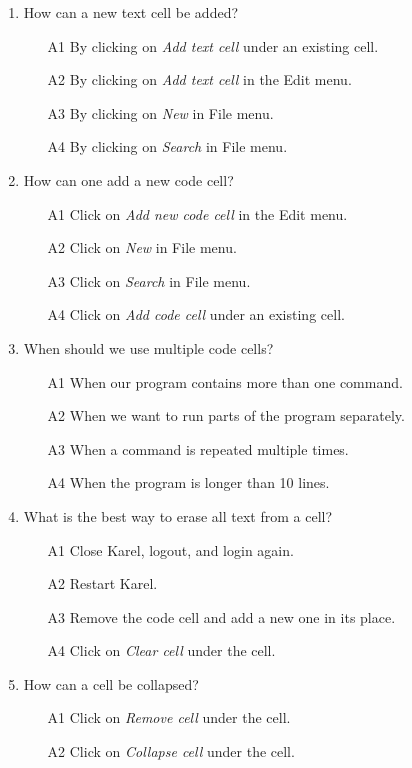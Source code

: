 \begin{enumerate}
\item How can a new text cell be added?
\begin{enumerate}
\item[A1] By clicking on {\em Add text cell} under an existing cell.
\item[A2] By clicking on {\em Add text cell} in the Edit menu.
\item[A3] By clicking on {\em New} in File menu.
\item[A4] By clicking on {\em Search} in File menu.
\end{enumerate}
\item How can one add a new code cell?
\begin{enumerate}
\item[A1] Click on {\em Add new code cell} in the Edit menu.
\item[A2] Click on {\em New} in File menu.
\item[A3] Click on {\em Search} in File menu.
\item[A4] Click on {\em Add code cell} under an existing cell.
\end{enumerate}
\item When should we use multiple code cells?
\begin{enumerate}
\item[A1] When our program contains more than one command.
\item[A2] When we want to run parts of the program separately.
\item[A3] When a command is repeated multiple times.
\item[A4] When the program is longer than 10 lines.
\end{enumerate}
\item What is the best way to erase all text from a cell?
\begin{enumerate}
\item[A1] Close Karel, logout, and login again. 
\item[A2] Restart Karel.
\item[A3] Remove the code cell and add a new one in its place.
\item[A4] Click on {\em Clear cell} under the cell.
\end{enumerate}
\item How can a cell be collapsed?
\begin{enumerate}
\item[A1] Click on {\em Remove cell} under the cell.
\item[A2] Click on {\em Collapse cell} under the cell.

\end{enumerate}
\end{enumerate}
